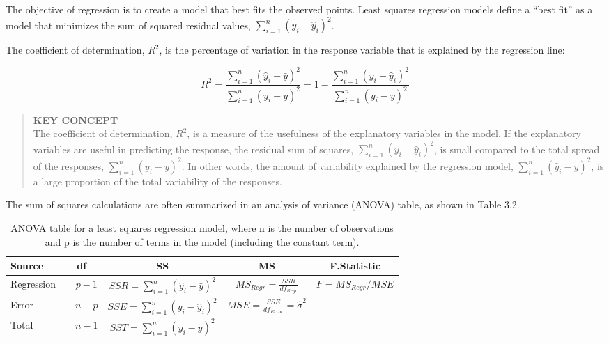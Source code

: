 \documentclass[
]{report}
\begin{document}
The objective of regression is to create a model that best fits the observed points. Least squares regression models define a ``best fit'' as a model that minimizes the sum of squared residual values, \(\sum_{i=1}^n (y_i - \hat{y}_i)^2\).

The coefficient of determination, \(R^2\), is the percentage of variation in the response variable that is explained by the regression line:

\begin{equation} 
 R^2 = \frac{\sum_{i=1}^n (\hat{y}_i - \bar{y})^2}{\sum_{i=1}^n (y_i - \bar{y})^2} 
     = 1 - \frac{\sum_{i=1}^n (y_i - \hat{y}_i)^2}{\sum_{i=1}^n (y_i - \bar{y})^2} 
 \tag{3.10} 
 \end{equation}

\begin{quote}
\textbf{KEY CONCEPT}\\
The coefficient of determination, \(R^2\), is a measure of the usefulness of the explanatory variables in the model. If the explanatory variables are useful in predicting the response, the residual sum of squares, \(\sum_{i=1}^n (y_i - \hat{y}_i)^2\), is small compared to the total spread of the responses, \(\sum_{i=1}^n (y_i - \bar{y})^2\). In other words, the amount of variability explained by the regression model, \(\sum_{i=1}^n (\hat{y}_i - \bar{y})^2\), is a large proportion of the total variability of the responses.
\end{quote}

The sum of squares calculations are often summarized in an analysis of variance (ANOVA) table, as shown in Table 3.2.

\begin{table}

\caption{\label{tab:anovatable} ANOVA table for a least squares regression model, where n is the number of observations and p is the number of terms in the model (including the constant term).}
\centering
\begin{tabular}[t]{l|c|c|c|c}
\hline
Source & df & SS & MS & F.Statistic\\
\hline
Regression & $\quad p - 1$ & $\displaystyle SSR = \sum_{i=1}^n (\hat{y}_i - \bar{y})^2$ & $MS_{Regr} = \tfrac{SSR}{df_{Regr}}$ & $F = MS_{Regr}/MSE$\\
\hline
Error & $\quad n - p$ & $\displaystyle SSE = \sum_{i=1}^n (y_i - \hat{y}_i)^2$ & $MSE = \tfrac{SSE}{df_{Error}} = \hat{\sigma}^2$ & \\
\hline
Total & $\quad n - 1$ & $\displaystyle SST = \sum_{i=1}^n (y_i - \bar{y})^2$ &  & \\
\hline
\end{tabular}
\end{table}
\end{document}
